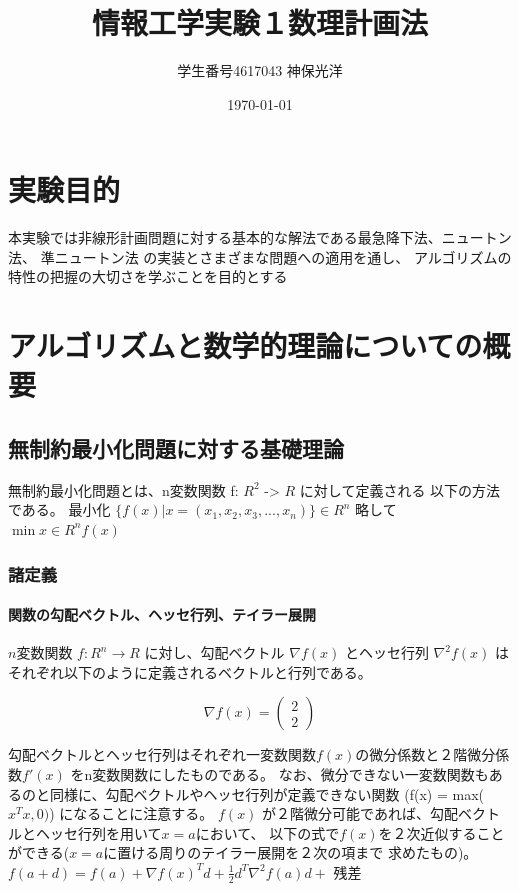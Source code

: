 \documentclass{jsarticle}
\title{情報工学実験１数理計画法}
\author{学生番号4617043 神保光洋}
\date{\today}
\begin{document}
\maketitle
\section{実験目的}
本実験では非線形計画問題に対する基本的な解法である最急降下法、ニュートン法、
準ニュートン法
の実装とさまざまな問題への適用を通し、
アルゴリズムの特性の把握の大切さを学ぶことを目的とする

\section{アルゴリズムと数学的理論についての概要}
\subsection{無制約最小化問題に対する基礎理論}
無制約最小化問題とは、n変数関数 f: $R^2$ -> $R$ に対して定義される
以下の方法である。
最小化
$\{ f(x) | x = (x_1, x_2, x_3, ..., x_n) \} \in R^n$ 略して $\min{x \in R^n} f(x)$

\subsubsection{諸定義}
\paragraph{関数の勾配ベクトル、ヘッセ行列、テイラー展開}
$n$変数関数 $f : R^n \rightarrow R$ に対し、勾配ベクトル $\nabla f(x)$
とヘッセ行列 $\nabla^2 f(x)$ はそれぞれ以下のように定義されるベクトルと行列である。

$$
\nabla f(x) =
\begin{pmatrix} 2 \\ 2 \end{pmatrix}
$$

勾配ベクトルとヘッセ行列はそれぞれ一変数関数$f(x)$の微分係数と２階微分係数$f'(x)$
をn変数関数にしたものである。
なお、微分できない一変数関数もあるのと同様に、勾配ベクトルやヘッセ行列が定義できない関数
(f(x) = max($x^Tx, 0)$)
になることに注意する。
$f(x)$ が２階微分可能であれば、勾配ベクトルとヘッセ行列を用いて$x=a$において、
以下の式で$f(x)$を２次近似することができる($x=a$に置ける周りのテイラー展開を２次の項まで
求めたもの)。
\\
$ f(a + d) = f(a) + \nabla f(x)^Td + \frac{1}{2}d^T\nabla^2f(a)d + $ 残差
\end{document}
